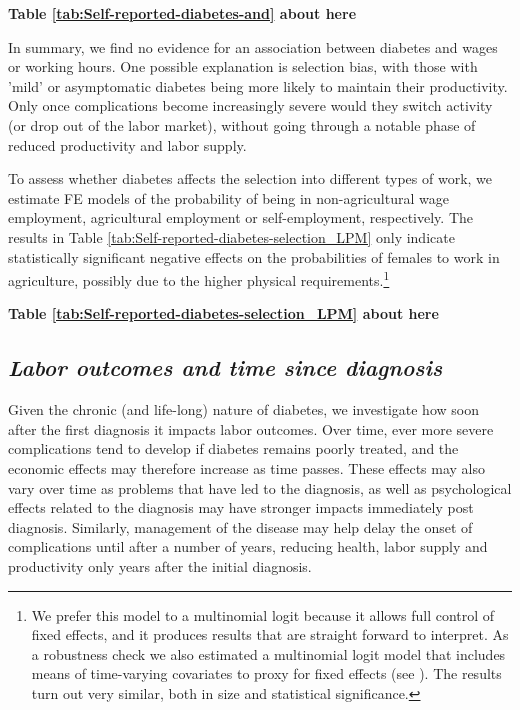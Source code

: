 \documentclass[12pt,english]{article}
\begin{document}
\begin{center}
	\textbf{Table \ref{tab:Self-reported-diabetes-and} about here}
\end{center}

In summary, we find no evidence for an association between diabetes and wages or working hours. One possible explanation is selection bias, with those with 'mild' or asymptomatic diabetes being more likely to maintain their productivity. Only once complications become increasingly severe would they switch activity (or drop out of the labor market), without going through a notable phase of reduced productivity and labor supply.

To assess whether diabetes affects the selection into different types of work, we estimate \ac{FE} models of the probability of being in non-agricultural wage employment, agricultural employment or self-employment, respectively. The results in Table \ref{tab:Self-reported-diabetes-selection_LPM} only indicate statistically significant negative effects on the probabilities of females to work in agriculture, possibly due to the higher physical requirements.\footnote{We prefer this model to a multinomial logit because it allows full control of fixed effects, and it produces results that are straight forward to interpret. As a robustness check we also estimated a multinomial logit model that includes means of time-varying covariates to proxy for fixed effects (see \textcite{Mundlak1978,Bell2015}). The results turn out very similar, both in size and statistical significance.}

\begin{center}
	\textbf{Table \ref{tab:Self-reported-diabetes-selection_LPM} about here}
\end{center}

\subsection{\label{sec:duration}\textit{Labor outcomes and time since diagnosis}}

Given the chronic (and life-long) nature of diabetes, we investigate how soon after the first diagnosis it impacts labor outcomes. Over time, ever more severe complications tend to develop if diabetes remains poorly treated, and the economic effects may therefore increase as time passes. These effects may also vary over time as problems that have led to the diagnosis, as well as psychological effects related to the diagnosis may have stronger impacts immediately post diagnosis. Similarly, management of the disease may help delay the onset of complications until after a number of years, reducing health, labor supply and productivity only years after the initial diagnosis.
\end{document}
